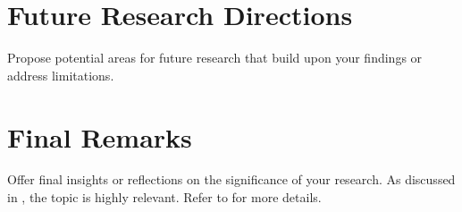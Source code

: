 \section{Future Research Directions}
Propose potential areas for future research that build upon your findings or address limitations.

\section{Final Remarks}
Offer final insights or reflections on the significance of your research.
As discussed in \cite{Sample2023}, the topic is highly relevant. Refer to \cite{Book2022} for more details.
